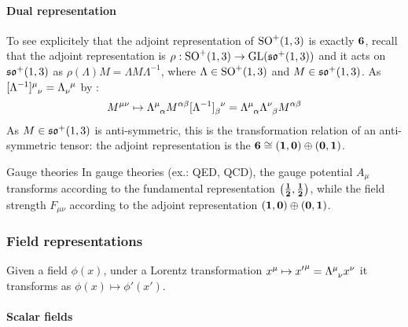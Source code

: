 \paragraph{Dual representation}

To see explicitely that the adjoint representation of $ \mathrm{SO}^+(1,3) $ is exactly $ \mathbf{6} $, recall that the adjoint representation is $ \rho : \mathrm{SO}^+(1,3) \rightarrow \mathrm{GL}(\mathfrak{so}^+(1,3)) $ and it acts on $ \mathfrak{so}^+(1,3) $ as $ \rho(\Lambda) M = \Lambda M \Lambda^{-1} $, where $ \Lambda \in \mathrm{SO}^+(1,3) $ and $ M \in \mathfrak{so}^+(1,3) $. As $ \tensor{[\Lambda^{-1}]}{^\mu_\nu} = \tensor{\Lambda}{_\nu^\mu} $ by :
\begin{equation*}
  M^{\mu \nu} \mapsto \tensor{\Lambda}{^\mu_\alpha} M^{\alpha \beta} \tensor{[\Lambda^{-1}]}{_\beta^\nu} = \tensor{\Lambda}{^\mu_\alpha} \tensor{\Lambda}{^\nu_\beta} M^{\alpha \beta}
\end{equation*}
As $ M \in \mathfrak{so}^+(1,3) $ is anti-symmetric, this is the transformation relation of an anti-symmetric tensor: the adjoint representation is the $ \mathbf{6} \cong \mathbf{\left( 1,0 \right)} \oplus \mathbf{\left( 0,1 \right)} $.

\begin{example}{Gauge theories}{}
  In gauge theories (ex.: QED, QCD), the gauge potential $ A_\mu $ transforms according to the fundamental representation $ \mathbf{\left( \frac{1}{2},\frac{1}{2} \right)} $, while the field strength $ F_{\mu \nu} $ according to the adjoint representation $ \mathbf{\left( 1,0 \right)} \oplus \mathbf{\left( 0,1 \right)} $.
\end{example}

\subsubsection{Field representations}

Given a field $ \phi(x) $, under a Lorentz transformation $ x^\mu \mapsto {x'}^\mu = \tensor{\Lambda}{^\mu_\nu} x^\nu $ it transforms as $ \phi(x) \mapsto \phi'(x') $.

\paragraph{Scalar fields}


